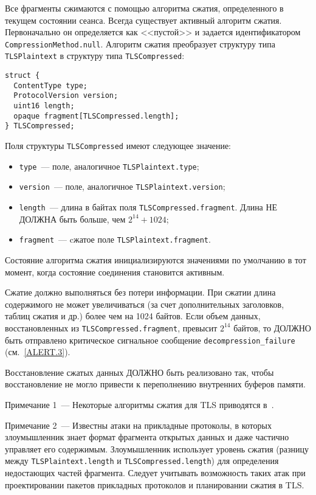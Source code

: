 Все фрагменты сжимаются с помощью алгоритма сжатия, определенного в 
текущем состоянии сеанса. Всегда существует активный алгоритм сжатия. 
Первоначально он определяется как <<пустой>> и задается идентификатором 
\lstinline{CompressionMethod.null}.  
Алгоритм сжатия преобразует структуру типа \lstinline{TLSPlaintext} в 
структуру типа \lstinline{TLSCompressed}:
\begin{lstlisting}
struct {
  ContentType type;
  ProtocolVersion version;
  uint16 length;
  opaque fragment[TLSCompressed.length];
} TLSCompressed;
\end{lstlisting}

Поля структуры \lstinline{TLSCompressed} имеют следующее значение:
\begin{itemize}
\item[--]
\lstinline{type}~--- поле, аналогичное \lstinline{TLSPlaintext.type};

\item[--]
\lstinline{version}~--- поле, аналогичное \lstinline{TLSPlaintext.version};

\item[--]
\lstinline{length}~--- длина в байтах поля 
\lstinline{TLSCompressed.fragment}. Длина НЕ ДОЛЖНА быть больше, чем 
$2^{14} + 1024$; 
\item[--]
\lstinline{fragment}~--- cжатое поле \lstinline{TLSPlaintext.fragment}.
\end{itemize}

Состояние алгоритма сжатия инициализируются значениями по умолчанию в тот 
момент, когда состояние соединения становится активным. 

Сжатие должно выполняться без потери информации. При сжатии длина 
содержимого не может увеличиваться (за счет дополнительных заголовков, 
таблиц сжатия и др.) более чем на 1024 байтов. Если объем данных, 
восстановленных из \lstinline{TLSCompressed.fragment}, превысит $2^{14}$ 
байтов, то ДОЛЖНО быть отправлено критическое сигнальное сообщение 
\lstinline{decompression_failure} (см.~\ref{ALERT.3}). 

Восстановление сжатых данных ДОЛЖНО быть реализовано так, чтобы 
восстановление не могло привести к переполнению внутренних буферов памяти. 

\begin{note}
Примечание 1~--- Некоторые алгоритмы сжатия для TLS приводятся в~\cite{RFC3749}. 
\end{note}

\begin{note}
Примечание 2~--- Известны атаки на прикладные протоколы, в которых 
злоумышленник знает формат фрагмента открытых данных и даже частично 
управляет его содержимым. Злоумышленник использует уровень сжатия (разницу 
между \lstinline{TLSPlaintext.length} и \lstinline{TLSCompressed.length}) 
для определения недостающих частей фрагмента. Следует учитывать 
возможность таких атак при проектировании пакетов прикладных протоколов и 
планировании сжатия в TLS. 
\end{note}
 
